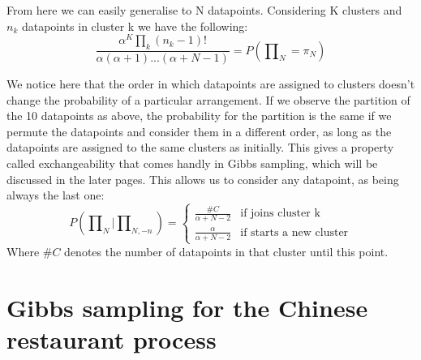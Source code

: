 \documentclass[12pt,a4paper]{article}
\begin{document}
From here we can easily generalise to N datapoints. Considering K clusters and $n_{k}$ datapoints in cluster k we have the following: $$\frac{\alpha^{K} \prod_{k}(n_{k}-1)!}{\alpha(\alpha+1)...(\alpha+N-1)} = P(\prod\nolimits_{N} = \pi_{N})$$

We notice here that the order in which datapoints are assigned to clusters doesn't change the probability of a particular arrangement. If we observe the partition of the 10 datapoints as above, the probability for the partition is the same if we permute the datapoints and consider them in a different order, as long as the datapoints are assigned to the same clusters as initially. This gives a property called exchangeability that comes handly in Gibbs sampling, which will be discussed in the later pages. This allows us to consider any datapoint, as being always the last one: 
$$P(\prod\nolimits_{N}|\prod\nolimits_{N, -n})= \left \{
    \begin{array}{ll}
		\frac{\#C}{\alpha+ N - 2} & \mbox{if joins cluster k} \\
		\frac{\alpha}{\alpha+N-2} & \mbox{if starts a new cluster} 
	\end{array}
\right. $$ Where $\#C$ denotes the number of datapoints in that cluster until this point.

\section{Gibbs sampling for the Chinese restaurant process}
\end{document}
